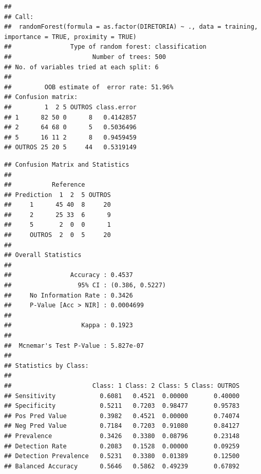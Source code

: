 \documentclass[]{article}
\newenvironment{Shaded}{\begin{snugshade}}{\end{snugshade}}
\newcommand{\CommentTok}[1]{\textcolor[rgb]{0.56,0.35,0.01}{\textit{#1}}}
\newcommand{\DataTypeTok}[1]{\textcolor[rgb]{0.13,0.29,0.53}{#1}}
\newcommand{\KeywordTok}[1]{\textcolor[rgb]{0.13,0.29,0.53}{\textbf{#1}}}
\newcommand{\NormalTok}[1]{#1}
\newcommand{\OperatorTok}[1]{\textcolor[rgb]{0.81,0.36,0.00}{\textbf{#1}}}
\newcommand{\StringTok}[1]{\textcolor[rgb]{0.31,0.60,0.02}{#1}}
\begin{document}
\begin{verbatim}
## 
## Call:
##  randomForest(formula = as.factor(DIRETORIA) ~ ., data = training,      importance = TRUE, proximity = TRUE) 
##                Type of random forest: classification
##                      Number of trees: 500
## No. of variables tried at each split: 6
## 
##         OOB estimate of  error rate: 51.96%
## Confusion matrix:
##         1  2 5 OUTROS class.error
## 1      82 50 0      8   0.4142857
## 2      64 68 0      5   0.5036496
## 5      16 11 2      8   0.9459459
## OUTROS 25 20 5     44   0.5319149
\end{verbatim}

\begin{Shaded}
\end{Shaded}

\begin{verbatim}
## Confusion Matrix and Statistics
## 
##           Reference
## Prediction  1  2  5 OUTROS
##     1      45 40  8     20
##     2      25 33  6      9
##     5       2  0  0      1
##     OUTROS  2  0  5     20
## 
## Overall Statistics
##                                          
##                Accuracy : 0.4537         
##                  95% CI : (0.386, 0.5227)
##     No Information Rate : 0.3426         
##     P-Value [Acc > NIR] : 0.0004699      
##                                          
##                   Kappa : 0.1923         
##                                          
##  Mcnemar's Test P-Value : 5.827e-07      
## 
## Statistics by Class:
## 
##                      Class: 1 Class: 2 Class: 5 Class: OUTROS
## Sensitivity            0.6081   0.4521  0.00000       0.40000
## Specificity            0.5211   0.7203  0.98477       0.95783
## Pos Pred Value         0.3982   0.4521  0.00000       0.74074
## Neg Pred Value         0.7184   0.7203  0.91080       0.84127
## Prevalence             0.3426   0.3380  0.08796       0.23148
## Detection Rate         0.2083   0.1528  0.00000       0.09259
## Detection Prevalence   0.5231   0.3380  0.01389       0.12500
## Balanced Accuracy      0.5646   0.5862  0.49239       0.67892
\end{verbatim}
\end{document}

